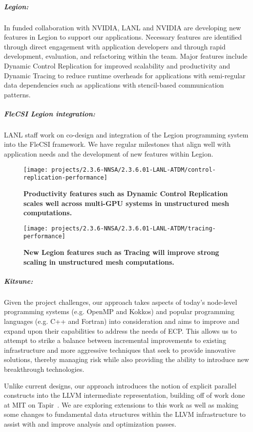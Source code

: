 \subparagraph{Legion:}

In funded collaboration with NVIDIA, LANL and NVIDIA are developing new features in Legion to support our applications. Necessary features are identified through direct engagement with application developers and through rapid development, evaluation, and refactoring within the team. Major features include Dynamic Control Replication for improved scalability and productivity and Dynamic Tracing to reduce runtime overheads for  applications with semi-regular data dependencies such as applications with stencil-based communication patterns. 


\subparagraph{FleCSI Legion integration:}
LANL staff work on co-design and integration of the Legion programming system into the FleCSI framework. We have regular milestones that align well with application needs and the development of new features within Legion. 


\begin{figure}[htb]
  \centering
  \texttt{[image: projects/2.3.6-NNSA/2.3.6.01-LANL-ATDM/control-replication-performance]}
        \caption{\label{fig:control-replication-performance}\textbf{Productivity features such as Dynamic Control Replication scales well across multi-GPU systems in unstructured mesh computations.}}
\end{figure}

\begin{figure}[htb]
        \centering
        \texttt{[image: projects/2.3.6-NNSA/2.3.6.01-LANL-ATDM/tracing-performance]}
        \caption{\label{fig:tracing-performance}\textbf{New Legion features such as Tracing will improve strong scaling in unstructured mesh computations.}}
\end{figure}


\subparagraph{Kitsune:}
Given the project challenges, our approach takes aspects of
today's node-level programming systems (e.g. OpenMP and Kokkos) and
popular programming languages (e.g. C++ and Fortran) into
consideration and aims to improve and expand upon their capabilities
to address the needs of ECP.  This allows us to attempt to strike a
balance between incremental improvements to existing infrastructure
and more aggressive techniques that seek to provide innovative
solutions, thereby managing risk while also providing the ability to introduce new
breakthrough technologies.

Unlike current designs, our approach introduces the notion of explicit
parallel constructs into the LLVM intermediate representation, building
off of work done at MIT on Tapir~\cite{2.3.6.01:kitsune:Schardl:2017}. 
We are exploring extensions to this work as well as making some changes
to fundamental data structures within the LLVM infrastructure to assist with
and improve analysis and optimization passes. 


